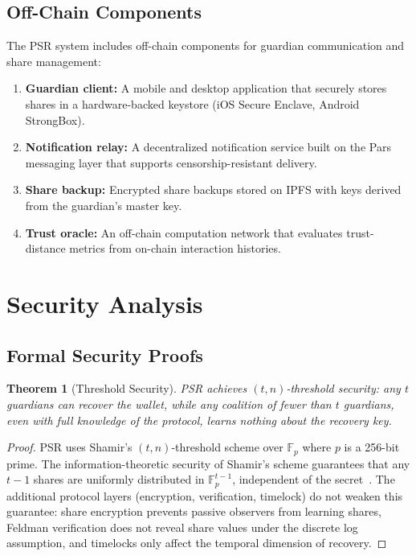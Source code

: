 \documentclass[11pt,a4paper,twocolumn]{article}
\newtheorem{theorem}{Theorem}[section]
\begin{document}
\subsection{Off-Chain Components}

The PSR system includes off-chain components for guardian communication and share management:

\begin{enumerate}
  \item \textbf{Guardian client:} A mobile and desktop application that securely stores shares in a hardware-backed keystore (iOS Secure Enclave, Android StrongBox).
  \item \textbf{Notification relay:} A decentralized notification service built on the Pars messaging layer that supports censorship-resistant delivery.
  \item \textbf{Share backup:} Encrypted share backups stored on IPFS with keys derived from the guardian's master key.
  \item \textbf{Trust oracle:} An off-chain computation network that evaluates trust-distance metrics from on-chain interaction histories.
\end{enumerate}

\section{Security Analysis}\label{sec:security}

\subsection{Formal Security Proofs}

\begin{theorem}[Threshold Security]\label{thm:threshold}
PSR achieves $(t, n)$-threshold security: any $t$ guardians can recover the wallet, while any coalition of fewer than $t$ guardians, even with full knowledge of the protocol, learns nothing about the recovery key.
\end{theorem}

\begin{proof}
PSR uses Shamir's $(t, n)$-threshold scheme over $\mathbb{F}_p$ where $p$ is a 256-bit prime. The information-theoretic security of Shamir's scheme guarantees that any $t-1$ shares are uniformly distributed in $\mathbb{F}_p^{t-1}$, independent of the secret~\cite{shamir1979share}. The additional protocol layers (encryption, verification, timelock) do not weaken this guarantee: share encryption prevents passive observers from learning shares, Feldman verification does not reveal share values under the discrete log assumption, and timelocks only affect the temporal dimension of recovery.
\end{proof}
\end{document}
